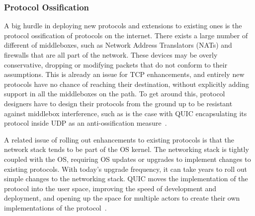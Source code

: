 \documentclass[english, 12pt, a4paper, elec, utf8, a-2b, online]{aaltothesis}
\begin{document}
\subsubsection{Protocol Ossification}
A big hurdle in deploying new protocols and extensions to existing ones
is the protocol ossification of protocols on the internet. There exists a large number of different
of middleboxes, such as Network Address Translators (NATs) and firewalls that are all
part of the network. These devices may be overly conservative, dropping or 
modifying packets that do not conform to their assumptions. This is already an
issue for TCP enhancements, and entirely new protocols have no chance of reaching
their destination, without explicitly adding support in all the middleboxes on the path.
To get around this, protocol designers have to design their protocols from the ground
up to be resistant against middlebox interference, such as is the case with QUIC encapsulating
its protocol inside UDP as an anti-ossification measure~\cite{Ossification}.

A related issue of rolling out enhancements to existing protocols is that the
network stack tends to be part of the OS kernel. The networking
stack is tightly coupled with the OS, requiring OS updates or upgrades to implement
changes to existing protocols. With today's upgrade frequency, it can take years
to roll out simple changes to the networking stack. QUIC moves the implementation of the 
protocol into the user space, improving the speed of development and deployment,
and opening up the space for multiple actors to create their own implementations of
the protocol~\cite{quic_transport_protocol_design}.
\end{document}
